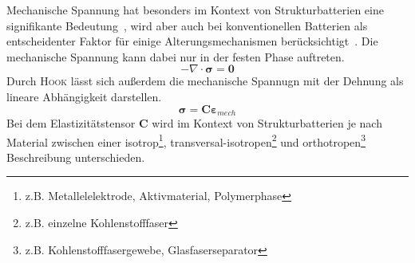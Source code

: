 Mechanische Spannung hat besonders im Kontext von Strukturbatterien eine signifikante Bedeutung~\cite{Carlstedt2020b}, wird aber auch bei konventionellen Batterien als entscheidenter Faktor für einige Alterungsmechanismen berücksichtigt~\cite{Mueller2019}. Die mechanische Spannung kann dabei nur in der festen Phase auftreten.
\begin{equation}
    -\nabla \cdot \boldsymbol{\sigma} = \boldsymbol{0}
\end{equation}
Durch \textsc{Hook} lässt sich außerdem die mechanische Spannugn mit der Dehnung als lineare Abhängigkeit darstellen.
\begin{equation}
    \boldsymbol{\sigma} = \boldsymbol{C} \boldsymbol{\varepsilon}_{mech}
\end{equation}
Bei dem Elastizitätstensor $\boldsymbol{C}$ wird im Kontext von Strukturbatterien je nach Material zwischen einer isotrop\footnote{z.B. Metallelelektrode, Aktivmaterial, Polymerphase}, transversal-isotropen\footnote{z.B. einzelne Kohlenstofffaser} und orthotropen\footnote{z.B. Kohlenstofffasergewebe, Glasfaserseparator} Beschreibung unterschieden.
